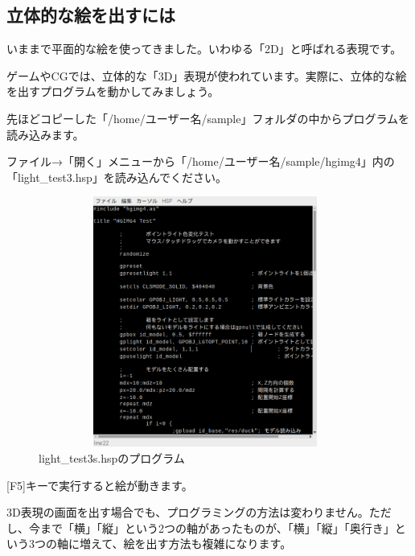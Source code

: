 \newpage
\subsection{立体的な絵を出すには}

いままで平面的な絵を使ってきました。いわゆる「2D」と呼ばれる表現です。

ゲームやCGでは、立体的な「3D」表現が使われています。実際に、立体的な絵を出すプログラムを動かしてみましょう。


先ほどコピーした「/home/ユーザー名/sample」フォルダの中からプログラムを読み込みます。

ファイル→「開く」メニューから「/home/ユーザー名/sample/hgimg4」内の「light\_test3.hsp」を読み込んでください。


\begin{figure}[H]
    \begin{center}
      \includegraphics[keepaspectratio,width=10.971cm,height=8.229cm]{text04-img/s_lighttest3s.png}
      \caption{light\_test3s.hspのプログラム}
    \end{center}
    \label{fig:prog_menu}
\end{figure}

[F5]キーで実行すると絵が動きます。

3D表現の画面を出す場合でも、プログラミングの方法は変わりません。ただし、今まで「横」「縦」という2つの軸があったものが、「横」「縦」「奥行き」という3つの軸に増えて、絵を出す方法も複雑になります。

